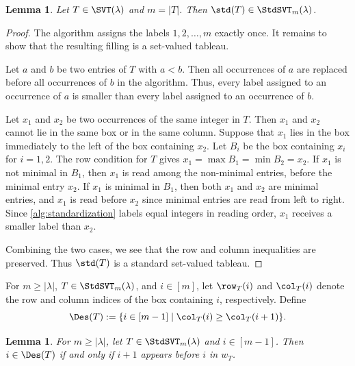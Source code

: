 \documentclass[12pt, reqno]{amsart}
\numberwithin{equation}{section}
\numberwithin{figure}{section}
\numberwithin{table}{section}
\newtheorem{lemma}[theorem]{Lemma}
\theoremstyle{definition}
\begin{document}
\begin{lemma}\label{lem:standardization-is-standard}
Let $T\in\SVT(\lambda)$ and $m = |T|$. 
Then $\std(T)\in\StdSVT_m(\lambda)$.
\end{lemma}


\begin{proof}
The algorithm assigns the labels $1,2,\ldots,m$ exactly once.
It remains to show that the resulting filling is a set-valued tableau.

Let $a$ and $b$ be two entries of $T$ with $a < b$.
Then all occurrences of $a$ are replaced before all occurrences of $b$ in the algorithm.
Thus, every label assigned to an occurrence of $a$ is smaller than every label assigned to an occurrence of $b$.

Let $x_1$ and $x_2$ be two occurrences of the same integer in $T$.
Then $x_1$ and $x_2$ cannot lie in the same box or in the same column.
Suppose that $x_1$ lies in the box immediately to the left of the box containing $x_2$.
Let $B_i$ be the box containing $x_i$ for $i=1,2$.
The row condition for $T$ gives $x_1=\max B_1=\min B_2=x_2$.
If $x_1$ is not minimal in $B_1$, then $x_1$ is read among the non-minimal entries, before the minimal entry $x_2$.
If $x_1$ is minimal in $B_1$, then both $x_1$ and $x_2$ are minimal entries, and $x_1$ is read before $x_2$ since minimal entries are read from left to right.
Since \cref{alg:standardization} labels equal integers in reading order, $x_1$ receives a smaller label than $x_2$.

Combining the two cases, we see that the row and column inequalities are preserved.
Thus $\std(T)$ is a standard set-valued tableau.
\end{proof}

For $m \ge |\lambda|$, $T \in \StdSVT_m(\lambda)$, and $i \in [m]$, let $\row_T(i)$ and $\col_T(i)$ denote the row and column indices of the box containing $i$, respectively.
Define
\[
\Des(T):=\{i \in [m-1] \mid \col_T(i) \ge \col_T(i+1)\}.
\]


\begin{lemma}\label{lem:descent box criterion}
For $m\ge |\lambda|$, let $T\in\StdSVT_m(\lambda)$ and $i\in[m-1]$.
Then $i\in\Des(T)$ if and only if $i+1$ appears before $i$ in $w_T$.
\end{lemma}
\end{document}
